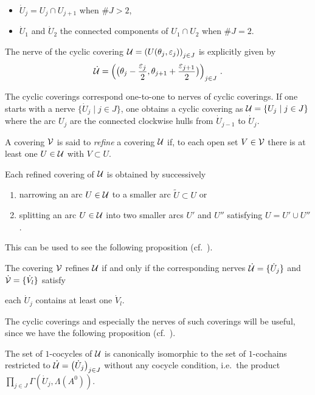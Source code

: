 \begin{defn}
\begin{enumerate}
\begin{itemize}
        \item $\dot U_j=U_j\cap U_{j+1}$ when $\#J>2$,
        \item $\dot U_1$ and $\dot U_2$ the connected components of
          $U_1\cap U_2$ when $\#J=2$.
      \end{itemize}
      \begin{s-rem}
        The nerve of the cyclic covering
        $\mathcal{U}=\left(U(\theta_j,\varepsilon_j)\right)_{j\in J}$ is explicitly given
        by
        \[
          \dot{\mathcal{U}}=\left(
            \bigl(\theta_{j}-\frac{\varepsilon_{j}}{2},
            \theta_{j+1}+\frac{\varepsilon_{j+1}}{2}\bigr)
          \right)_{j\in J} \,.
        \]
      \end{s-rem}
  \end{enumerate}
\end{defn}
The cyclic coverings correspond one-to-one to nerves of cyclic coverings. If
one starts with a nerve $\{\dot U_j \mid j\in J\}$, one obtains a cyclic
covering as $\mathcal{U}=\{U_j \mid j\in J\}$ where the arc $U_j$ are the connected
clockwise hulls from $\dot U_{j-1}$ to $\dot U_j$.

\begin{defn}
  A covering $\mathcal{V}$ is said to \emph{refine} a covering $\mathcal{U}$ if, to each open
  set $V\in\mathcal{V}$ there is at least one $U\in\mathcal{U}$ with $V\subset U$.
\end{defn}
Each refined covering of $\mathcal{U}$ is obtained by successively
\begin{enumerate}
\item narrowing an arc $U\in\mathcal{U}$ to a smaller arc $\tilde U\subset U$ or
\item splitting an arc $U\in\mathcal{U}$ into two smaller arcs $U'$ and $U''$
  satisfying $U=U'\cup U''$.
\end{enumerate}
This can be used to see the following proposition
(cf.\ \cite[Prop.II.1.3]{Loday1994}).
\begin{prop}
  The covering $\mathcal{V}$ refines $\mathcal{U}$ if and only if the corresponding nerves
  $\dot{\mathcal{U}}=\{\dot U_j\}$ and $\dot{\mathcal{V}}=\{\dot V_l\}$ satisfy
  \begin{einr}
    each $\dot U_j$ contains at least one $\dot V_l$.
  \end{einr}
\end{prop}

The cyclic coverings and especially the nerves of such coverings will be
useful, since we have the following proposition
(cf.~\cite[Prop.2.6]{Loday2004}).
\begin{prop}\label{prop:cocycleIsomNerve}
  The set of $1$-cocycles of $\mathcal{U}$ is canonically isomorphic to the set of
  $1$-cochains restricted to $\dot{\mathcal{U}}=\bigl(\dot U_j\bigr)_{j\in J}$ without any
  cocycle condition, i.e.\ the product
  $\prod_{j\in J}\Gamma(\dot U_j,\Lambda(A^0))$.
\end{prop}

